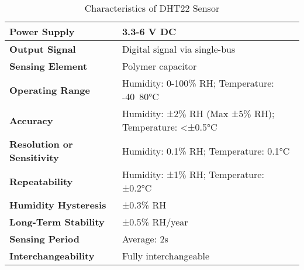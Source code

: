 \begin{table}[ht]
    \centering
    \renewcommand{\arraystretch}{1.3} %
    \begin{tabular}{|p{5cm}|p{7cm}|} %
    \hline
     \textbf{Power Supply}    & 3.3-6 V DC   \\ \hline
     \textbf{Output Signal}    & Digital signal via single-bus   \\ \hline
    \textbf{Sensing Element}    & Polymer capacitor   \\ \hline
    \textbf{Operating Range}    & Humidity: 0-100\% RH; Temperature: -40~80°C    \\ \hline
    \textbf{Accuracy}    & Humidity: ±2\% RH (Max ±5\% RH); Temperature: <±0.5°C     \\ \hline
    \textbf{Resolution or Sensitivity}    & Humidity: 0.1\% RH; Temperature: 0.1°C    \\ \hline
    \textbf{Repeatability}    & Humidity: ±1\% RH; Temperature: ±0.2°C   \\ \hline
    \textbf{Humidity Hysteresis}    & ±0.3\% RH   \\ \hline
    \textbf{Long-Term Stability}    & ±0.5\% RH/year   \\ \hline
    \textbf{Sensing Period}   & Average: 2s  \\ \hline
    \textbf{Interchangeability}   & Fully interchangeable  \\ \hline
    \end{tabular}
    \caption{Characteristics of DHT22 Sensor}
    \label{tab:DHT22_charac}
\end{table}
